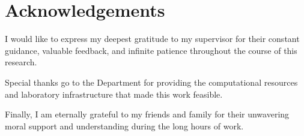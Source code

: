 \chapter*{Acknowledgements}
I would like to express my deepest gratitude to my supervisor for their constant guidance, valuable feedback, and infinite patience throughout the course of this research.

Special thanks go to the Department for providing the computational resources and laboratory infrastructure that made this work feasible.

Finally, I am eternally grateful to my friends and family for their unwavering moral support and understanding during the long hours of work.

